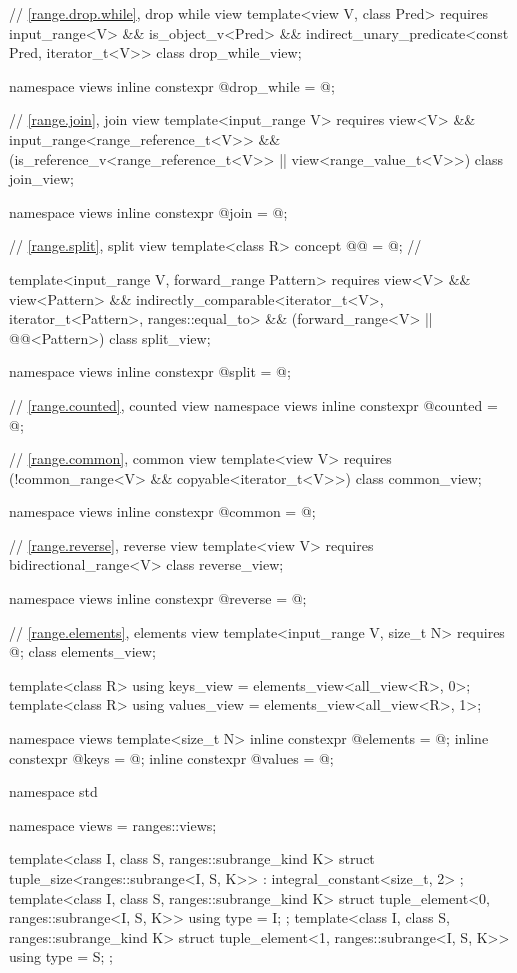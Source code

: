 \begin{codeblock}
{  // \ref{range.drop.while}, drop while view
  template<view V, class Pred>
    requires input_range<V> && is_object_v<Pred> &&
      indirect_unary_predicate<const Pred, iterator_t<V>>
    class drop_while_view;

  namespace views { inline constexpr @\unspec@ drop_while = @\unspec@; }

  // \ref{range.join}, join view
  template<input_range V>
    requires view<V> && input_range<range_reference_t<V>> &&
             (is_reference_v<range_reference_t<V>> ||
              view<range_value_t<V>>)
  class join_view;

  namespace views { inline constexpr @\unspec@ join = @\unspec@; }

  // \ref{range.split}, split view
  template<class R>
    concept @@ = @\seebelow@;   // \expos

  template<input_range V, forward_range Pattern>
    requires view<V> && view<Pattern> &&
             indirectly_comparable<iterator_t<V>, iterator_t<Pattern>, ranges::equal_to> &&
             (forward_range<V> || @@<Pattern>)
  class split_view;

  namespace views { inline constexpr @\unspec@ split = @\unspec@; }

  // \ref{range.counted}, counted view
  namespace views { inline constexpr @\unspec@ counted = @\unspec@; }

  // \ref{range.common}, common view
  template<view V>
    requires (!common_range<V> && copyable<iterator_t<V>>)
  class common_view;

  namespace views { inline constexpr @\unspec@ common = @\unspec@; }

  // \ref{range.reverse}, reverse view
  template<view V>
    requires bidirectional_range<V>
  class reverse_view;

  namespace views { inline constexpr @\unspec@ reverse = @\unspec@; }

  // \ref{range.elements}, elements view
  template<input_range V, size_t N>
    requires @\seebelow@;
  class elements_view;

  template<class R>
    using keys_view = elements_view<all_view<R>, 0>;
  template<class R>
    using values_view = elements_view<all_view<R>, 1>;

  namespace views {
    template<size_t N>
      inline constexpr @\unspec@ elements = @\unspec@ ;
    inline constexpr @\unspec@ keys = @\unspec@ ;
    inline constexpr @\unspec@ values = @\unspec@ ;
  }
}

namespace std {
  namespace views = ranges::views;

  template<class I, class S, ranges::subrange_kind K>
  struct tuple_size<ranges::subrange<I, S, K>>
    : integral_constant<size_t, 2> {};
  template<class I, class S, ranges::subrange_kind K>
  struct tuple_element<0, ranges::subrange<I, S, K>> {
    using type = I;
  };
  template<class I, class S, ranges::subrange_kind K>
  struct tuple_element<1, ranges::subrange<I, S, K>> {
    using type = S;
  };
}
\end{codeblock}

